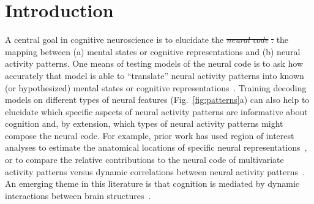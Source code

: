 \documentclass[english]{article}
\providecommand{\DIFaddtex}[1]{{\protect\color{blue}\uwave{#1}}} %
\providecommand{\DIFdeltex}[1]{{\protect\color{red}\sout{#1}}}                      %
\providecommand{\DIFaddbegin}{} %
\providecommand{\DIFaddend}{} %
\providecommand{\DIFdelbegin}{} %
\providecommand{\DIFdelend}{} %
\providecommand{\DIFadd}[1]{\texorpdfstring{\DIFaddtex{#1}}{#1}} %
\providecommand{\DIFdel}[1]{\texorpdfstring{\DIFdeltex{#1}}{}} %
\newcommand{\DIFscaledelfig}{0.5}
\newlength{\DIFdelgraphicswidth} %
\newlength{\DIFdelgraphicsheight} %
\newcommand{\DIFaddincludegraphics}[2][]{{\color{blue}\fbox{\DIFOincludegraphics[#1]{#2}}}} %
\newcommand{\DIFdelincludegraphics}[2][]{%
\sbox{\DIFdelgraphicsbox}{\DIFOincludegraphics[#1]{#2}}%
\settoboxwidth{\DIFdelgraphicswidth}{\DIFdelgraphicsbox} %
\settoboxtotalheight{\DIFdelgraphicsheight}{\DIFdelgraphicsbox} %
\scalebox{\DIFscaledelfig}{%
\parbox[b]{\DIFdelgraphicswidth}{\usebox{\DIFdelgraphicsbox}\\[-\baselineskip] \rule{\DIFdelgraphicswidth}{0em}}\llap{\resizebox{\DIFdelgraphicswidth}{\DIFdelgraphicsheight}{%
\setlength{\unitlength}{\DIFdelgraphicswidth}%
\begin{picture}(1,1)%
\thicklines\linethickness{2pt} %
{\color[rgb]{1,0,0}\put(0,0){\framebox(1,1){}}}%
{\color[rgb]{1,0,0}\put(0,0){\line( 1,1){1}}}%
{\color[rgb]{1,0,0}\put(0,1){\line(1,-1){1}}}%
\end{picture}%
}\hspace*{3pt}}} %
} %
\DeclareRobustCommand{\DIFaddbegin}{\DIFOaddbegin \let\includegraphics\DIFaddincludegraphics} %
\DeclareRobustCommand{\DIFaddend}{\DIFOaddend \let\includegraphics\DIFOincludegraphics} %
\DeclareRobustCommand{\DIFdelbegin}{\DIFOdelbegin \let\includegraphics\DIFdelincludegraphics} %
\DeclareRobustCommand{\DIFdelend}{\DIFOaddend \let\includegraphics\DIFOincludegraphics} %
\begin{document}
\section*{Introduction}
A central goal in cognitive neuroscience is to elucidate the
\DIFdelbegin \textit{\DIFdel{neural code}}%
\DIFdel{: }\DIFdelend \DIFaddbegin \DIFadd{neural code: i.e., }\DIFaddend the mapping between (a) mental states or
cognitive representations and (b) neural activity patterns. One means
of testing models of the neural code is to ask how accurately that
model is able to ``translate'' neural activity patterns into known (or
hypothesized) mental states or cognitive
representations~\citep[e.g.,][]{HaxbEtal01, NormEtal06b, TongPrat12,
  MitcEtal08a, KamiTong05, NishEtal11, PereEtal18, HuthEtal12,
  HuthEtal16}.  Training decoding models on different types of neural
features (Fig.~\ref{fig:patterns}a) can also help to elucidate which
specific aspects of neural activity patterns are informative about
cognition and, by extension, which types of neural activity patterns
might compose the neural code.  For example, prior work has used
region of interest analyses to estimate the anatomical locations of
specific neural representations~\citep[e.g.,][]{EtzeEtal09}, or to
compare the relative contributions to the neural code of multivariate
activity patterns versus dynamic correlations between neural activity
patterns~\citep[e.g.,][]{MannEtal18, FongEtal19}.  An emerging theme
in this literature is that cognition is mediated by dynamic
interactions between brain structures~\citep{Gros88, Fris00, SporHone06, BassEtal06,
  Turk13, DemeEtal19, SoloEtal19, LuriEtal18, PretEtal17, ZouEtal19,
  MackEtal17, BresKels01, McIn00}.
\end{document}
